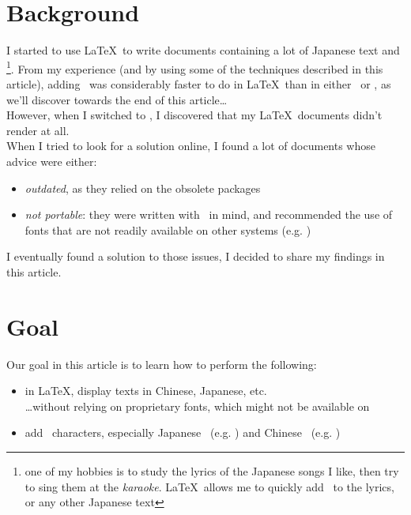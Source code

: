 
\renewcommand{\currentPart}{Preamble}

\section*{Background}
I started to use \LaTeX\ to write documents containing a lot of Japanese text and \furigana\footnote{one of my hobbies is to study the lyrics of the Japanese songs I like, then try to sing them at the \emph{karaoke}. \LaTeX\ allows me to quickly add \furigana\ to the lyrics, or any other Japanese text}. From my experience (and by using some of the techniques described in this article), adding \furigana\ was considerably faster to do in \LaTeX\ than in either \Word\ or \LibreOffice, as we'll discover towards the end of this  article\dots \\


However, when I switched to \Linux, I discovered that my \LaTeX\ documents didn't render at all. \\

When I tried to look for a solution online, I found a lot of documents whose advice were either:
\begin{itemize}
	\item \emph{outdated}, as they relied on the obsolete packages %
	\item \emph{not portable}: they were written with \Windows\ in mind, and recommended the use of fonts that are not readily available on other systems (e.g. \Meiryo)
\end{itemize}

I eventually found a solution to those issues, I decided to share my findings in this article.




\section*{Goal}

Our goal in this article is to learn how to perform the following:

\begin{itemize}
	\item in \LaTeX, display texts in Chinese, Japanese, etc. \\
	\phantom{MM}\dots without relying on proprietary fonts, which might not be available on \Linux
	\item add \rruby\ characters, especially Japanese \furigana\ (e.g. \kabocha) and Chinese \ppinyin\ (e.g. )
\end{itemize}



